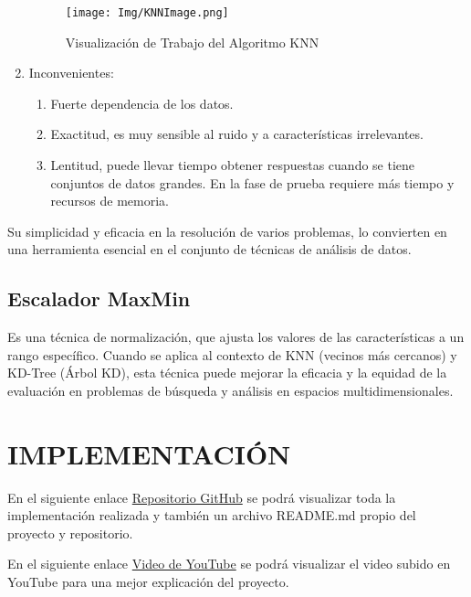 \documentclass{article}
\begin{document}
\begin{sloppypar}
\begin{enumerate}
    \begin{figure}[H]
    \centering
    \texttt{[image: Img/KNNImage.png]}
    \caption{\label{fig:funcionamientoKNN}Visualización de Trabajo del Algoritmo KNN}
    \end{figure}
    
    \item Inconvenientes:      
    \begin{enumerate}
       \item Fuerte dependencia de los datos.   
       \item Exactitud, es muy sensible al ruido y a características irrelevantes.
       \item Lentitud, puede llevar tiempo obtener respuestas cuando se tiene conjuntos de datos grandes. En la fase de prueba requiere más tiempo y recursos de memoria.
    \end{enumerate} 
\end{enumerate}

Su simplicidad y eficacia en la resolución de varios problemas, lo convierten en una herramienta esencial en el conjunto de técnicas de análisis de datos. \cite{GeorgeGaryStanley2009Algorithms}

\subsection{Escalador MaxMin}
Es una técnica de normalización, que ajusta los valores de las características a un rango específico. Cuando se aplica al contexto de KNN (vecinos más cercanos) y KD-Tree (Árbol KD), esta técnica puede mejorar la eficacia y la equidad de la evaluación en problemas de búsqueda y análisis en espacios multidimensionales.
\clearpage
\section{IMPLEMENTACIÓN}
En el siguiente enlace \href{https://github.com/abelborit/computer-science-master/tree/main/MCC-01_algorithms-and-data-structures/k-nearest-neighbor-clasiffier}{Repositorio GitHub} se podrá visualizar toda la implementación realizada y también un archivo README.md propio del proyecto y repositorio.
\vspace{0.7cm} 

En el siguiente enlace \href{https://youtu.be/RhW9vNW0_3s}{Video de YouTube} se podrá visualizar el video subido en YouTube para una mejor explicación del proyecto.


\end{sloppypar}
\end{document}
